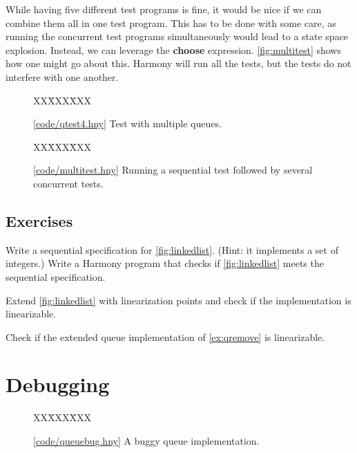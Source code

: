 \documentclass{report}
\newcommand{\harmonysource}[1]{
\begin{tabbing}
XX\=XXX\=XXX\kill
    
\end{tabbing}
}
\newcommand{\harmonylink}[1]{%
[\href{https://harmony.cs.cornell.edu/#1}{\underline{#1}}]%
}
\newenvironment{code}{
\tcolorbox
}{
\endtcolorbox
}
\begin{document}
While having five different test programs is fine,
it would be nice if we can combine them all in one
test program.
This has to be done with some care, as running the
concurrent test programs simultaneously would
lead to a state space explosion.
Instead, we can leverage the \textbf{choose}
expression.
\autoref{fig:multitest} shows how one might go
about this.
Harmony will run all the tests, but the
tests do not interfere with one another.

\begin{figure}
\begin{code}
\harmonysource{qtest4}
\end{code}
\caption{\harmonylink{code/qtest4.hny} Test with multiple queues.}
\label{fig:qtest4}
\end{figure}

\begin{figure}
\begin{code}
\harmonysource{multitest}
\end{code}
\caption{\harmonylink{code/multitest.hny} Running a
sequential test followed by several concurrent tests.}
\label{fig:multitest}
\end{figure}

\section*{Exercises}
\begin{problems}
\item Write a sequential specification for \autoref{fig:linkedlist}.
(Hint: it implements a set of integers.)
Write a Harmony program that checks if \autoref{fig:linkedlist} meets
the sequential specification.
\item Extend \autoref{fig:linkedlist} with linearization points and
check if the implementation is linearizable.
\item Check if the extended queue implementation of \autoref{ex:qremove}
is linearizable.
\end{problems}

\chapter{Debugging}
\label{ch:debugging}

\begin{figure}
\begin{code}
\harmonysource{queuebug}
\end{code}
\caption{\harmonylink{code/queuebug.hny} A buggy queue implementation.}
\label{fig:queuebug}
\end{figure}
\end{document}
